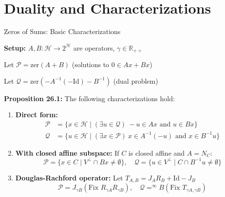 \documentclass[aspectratio=169,10pt]{beamer}
\begin{document}

\section{Duality and Characterizations}

\begin{frame}{Zeros of Sums: Basic Characterizations}

\textbf{Setup:} $A, B: \mathcal{H} \to 2^{\mathcal{H}}$ are operators, $\gamma \in \mathbb{R}_{++}$

\vspace{0.2cm}
Let $\mathcal{P} = \text{zer}(A + B)$ (solutions to $0 \in Ax + Bx$)

\vspace{0.2cm}
Let $\mathcal{Q} = \text{zer}(-A^{-1}(-\text{Id}) - B^{-1})$ (dual problem)

\vspace{0.3cm}
\textbf{Proposition 26.1:} The following characterizations hold:

\begin{enumerate}
  \item[(i)] \textbf{Direct form:}
    \begin{align*}
      \mathcal{P} &= \{x \in \mathcal{H} \mid (\exists u \in \mathcal{Q}) \: -u \in Ax \text{ and } u \in Bx\} \\
      \mathcal{Q} &= \{u \in \mathcal{H} \mid (\exists x \in \mathcal{P}) \: x \in A^{-1}(-u) \text{ and } x \in B^{-1}u\}
    \end{align*}

  \item[(ii)] \textbf{With closed affine subspace:} If $C$ is closed affine and $A = N_C$:
    \[ \mathcal{P} = \{x \in C \mid V^{\perp} \cap Bx \neq \emptyset\}, \quad
       \mathcal{Q} = \{u \in V^{\perp} \mid C \cap B^{-1}u \neq \emptyset\} \]

  \item[(iii)] \textbf{Douglas-Rachford operator:} Let $T_{A,B} = J_A R_B + \text{Id} - J_B$
    \[ \mathcal{P} = J_{\gamma B}(\text{Fix } R_{\gamma A}R_{\gamma B}), \quad
       \mathcal{Q} = ^{\infty}B(\text{Fix } T_{\gamma A,\gamma B}) \]
\end{enumerate}

\end{frame}
\end{document}
